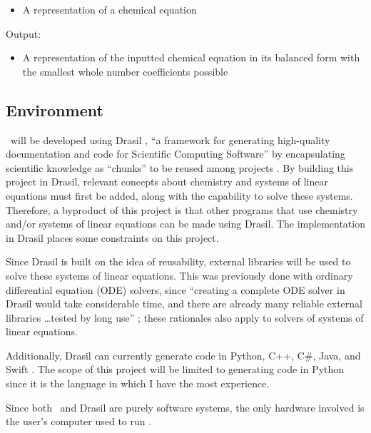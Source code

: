 \documentclass{article}
\begin{document}
\begin{itemize}
	\item A representation of a chemical equation
\end{itemize}

\noindent Output:

\begin{itemize}
\item A representation of the inputted chemical equation in its balanced form
with the smallest whole number coefficients possible
\end{itemize}

\subsection{Environment} \label{env}

\null\newline
\null\newline
\noindent\progname~will be developed using Drasil
\cite{carette_drasil_2021}, ``a framework for generating
high-quality documentation and code for Scientific Computing Software''
\cite[p. iii]{maclachlan_design_2020} by encapsulating scientific knowledge as
``chunks'' to be reused among projects \cite{maclachlan_design_2020}. By 
building this project in Drasil, relevant concepts about chemistry and systems
of linear equations must first be added, along with the capability to solve
these systems. Therefore, a byproduct of this project is that other programs
that use chemistry and/or systems of linear equations can be made using
Drasil. The implementation in Drasil places some constraints on this project.

Since Drasil is built on the idea of reusability, external libraries will be
used to solve these systems of linear equations. This was previously done with
ordinary differential equation (ODE) solvers, since ``creating a complete ODE
solver in Drasil would take considerable time, and there are already many
reliable external libraries \dots tested by long use''
\cite[p. 24]{chen_solving_2022}; these rationales also apply to solvers of
systems of linear equations.

Additionally, Drasil can currently generate code in Python, C++, C\#, Java, and
Swift \cite{chen_solving_2022}. The scope of this project will be limited to 
generating code in Python since it is the language in which I 
have the most experience. 

Since both \progname~and Drasil are purely software systems, the only
hardware involved is the user's computer used to run \progname.
\end{document}
